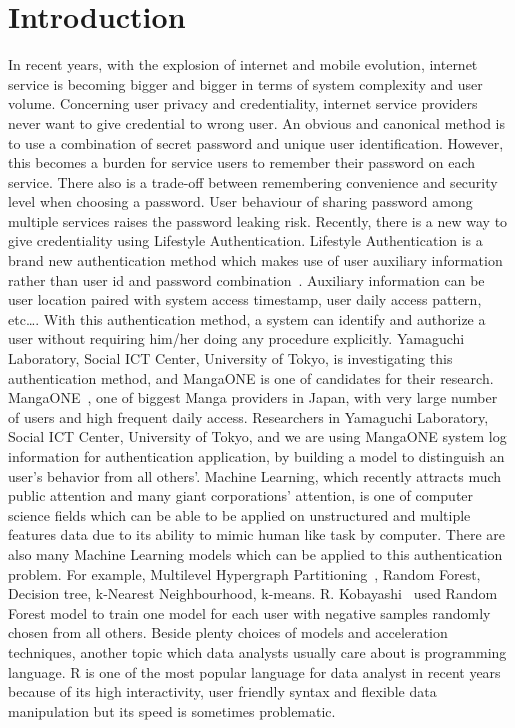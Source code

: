 \documentclass[English]{dicomopapers}
\begin{document}
\section{Introduction}
In recent years, with the explosion of internet and mobile evolution, internet service is becoming bigger and bigger in terms of system complexity and user volume. Concerning user privacy and credentiality, internet service providers never want to give credential to wrong user. An obvious and canonical method is to use a combination of secret password and unique user identification. However, this becomes a burden for service users to remember their password on each service. There also is a trade-off between remembering convenience and security level when choosing a password. User behaviour of sharing password among multiple services raises the password leaking risk. Recently, there is a new way to give credentiality using Lifestyle Authentication. Lifestyle Authentication is a brand new authentication method which makes use of user auxiliary information rather than user id and password combination~\cite{weko_175884_1}. Auxiliary information can be user location paired with system access timestamp, user daily access pattern, etc\ldots. With this authentication method, a system can identify and authorize a user without requiring him/her doing any procedure explicitly. Yamaguchi Laboratory, Social ICT Center, University of Tokyo, is investigating this authentication method, and MangaONE is one of candidates for their research.\newline
MangaONE~\cite{mangaone}, one of biggest Manga providers in Japan, with very large number of users and high frequent daily access. Researchers in Yamaguchi Laboratory, Social ICT Center, University of Tokyo, and we are using MangaONE system log information for authentication application, by building a model to distinguish an user's behavior from all others'. Machine Learning, which recently attracts much public attention and many giant corporations' attention, is one of computer science fields which can be able to be applied on unstructured and multiple features data due to its ability to mimic human like task by computer. There are also many Machine Learning models which can be applied to this authentication problem. For example, Multilevel Hypergraph Partitioning~\cite{karypis1999multilevel}, Random Forest, Decision tree, k-Nearest Neighbourhood, k-means. R. Kobayashi~\cite{kobayashi1} used Random Forest model to train one model for each user with negative samples randomly chosen from all others. Beside plenty choices of models and acceleration techniques, another topic which data analysts usually care about is programming language. R is one of the most popular language for data analyst in recent years because of its high interactivity, user friendly syntax and flexible data manipulation but its speed is sometimes problematic.\newline
\end{document}
